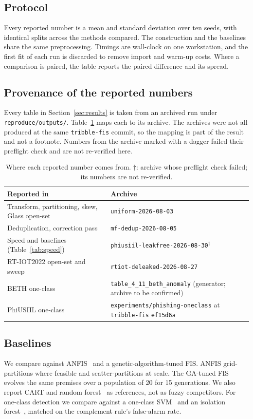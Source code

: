 \documentclass[journal]{IEEEtran}
\begin{document}
\subsection{Protocol}
Every reported number is a mean and standard deviation over ten seeds, with identical splits across the methods compared. The construction and the baselines share the same preprocessing. Timings are wall-clock on one workstation, and the first fit of each run is discarded to remove import and warm-up costs. Where a comparison is paired, the table reports the paired difference and its spread.

\subsection{Provenance of the reported numbers}
Every table in Section~\ref{sec:results} is taken from an archived run under \texttt{reproduce/outputs/}. Table~\ref{tab:provenance} maps each to its archive. The archives were not all produced at the same \texttt{tribble-fis} commit, so the mapping is part of the result and not a footnote. Numbers from the archive marked with a dagger failed their preflight check and are not re-verified here.

\begin{table}[t]
\centering
\caption{Where each reported number comes from. $\dagger$: archive whose preflight check failed; its numbers are not re-verified.}
\label{tab:provenance}
\begin{tabular}{ll}
\toprule
Reported in & Archive \\
\midrule
Transform, partitioning, skew, Glass open-set & \texttt{uniform-2026-08-03} \\
Deduplication, correction pass & \texttt{mf-dedup-2026-08-05} \\
Speed and baselines (Table~\ref{tab:speed}) & \texttt{phiusiil-leakfree-2026-08-30}$^\dagger$ \\
RT-IOT2022 open-set and sweep & \texttt{rtiot-deleaked-2026-08-27} \\
BETH one-class & \texttt{table\_4\_11\_beth\_anomaly} (generator; archive to be confirmed) \\
PhiUSIIL one-class & \texttt{experiments/phishing-oneclass} at \texttt{tribble-fis} \texttt{ef15d6a} \\
\bottomrule
\end{tabular}
\end{table}

\subsection{Baselines}
We compare against ANFIS~\cite{jang1993anfis} and a genetic-algorithm-tuned FIS. ANFIS grid-partitions where feasible and scatter-partitions at scale. The GA-tuned FIS evolves the same premises over a population of 20 for 15 generations. We also report CART and random forest~\cite{breiman2001random} as references, not as fuzzy competitors. For one-class detection we compare against a one-class SVM~\cite{scholkopf2001estimating} and an isolation forest~\cite{liu2008isolation}, matched on the complement rule's false-alarm rate.
\end{document}
